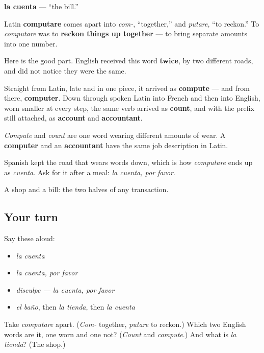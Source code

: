 \begin{cousinweb}
\textbf{la cuenta} — \textquotedblleft{}the bill.\textquotedblright{}

Latin \textbf{computare} comes apart into \emph{com-}, \textquotedblleft{}together,\textquotedblright{} and \emph{putare}, \textquotedblleft{}to reckon.\textquotedblright{} To \emph{computare} was to \textbf{reckon things up together} — to bring separate amounts into one number.

Here is the good part. English received this word \textbf{twice}, by two different roads, and did not notice they were the same.

Straight from Latin, late and in one piece, it arrived as \textbf{compute} — and from there, \textbf{computer}. Down through spoken Latin into French and then into English, worn smaller at every step, the same verb arrived as \textbf{count}, and with the prefix still attached, as \textbf{account} and \textbf{accountant}.

\emph{Compute} and \emph{count} are one word wearing different amounts of wear. A \textbf{computer} and an \textbf{accountant} have the same job description in Latin.

Spanish kept the road that wears words down, which is how \emph{computare} ends up as \emph{cuenta}. Ask for it after a meal: \emph{la cuenta, por favor}.
\end{cousinweb}

\begin{grammarlens}[title={What you've built}]
A shop and a bill: the two halves of any transaction.
\end{grammarlens}

\subsection*{Your turn}
Say these aloud:

\begin{itemize}
\raggedright
  \item \emph{la cuenta}
  \item \emph{la cuenta, por favor}
  \item \emph{disculpe — la cuenta, por favor}
  \item \emph{el baño}, then \emph{la tienda}, then \emph{la cuenta}
\end{itemize}

\begin{tcolorbox}[breakable,colback=teal!4,colframe=teal!35!black,title={Before you move on}]
Take \emph{computare} apart. (\emph{Com-} together, \emph{putare} to reckon.) Which two English words are it, one worn and one not? (\emph{Count} and \emph{compute}.) And what is \emph{la tienda}? (The shop.)
\end{tcolorbox}

